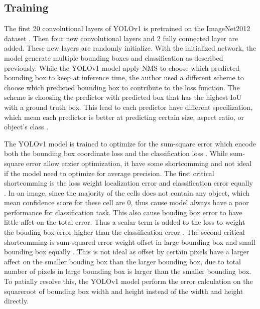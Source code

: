 \subsection{Training}
The first 20 convolutional layers of YOLOv1 is pretrained on the ImageNet2012 dataset \cite{ImageNet_dataset}. Then four new convolutional layers and 2 fully connected layer are added. These new layers are randomly initialize. With the initialized network, the model generate multiple bounding boxes and classification as described previously. While the YOLOv1 model apply NMS to choose which predicted bounding box to keep at inference time, the author used a different scheme to choose which predicted bounding box to contribute to the loss function. The scheme is choosing the predictor with predicted box that has the highest IoU with a ground truth box. This lead to each predictor have different specilization, which mean each predictor is better at predicting certain size, aspect ratio, or object's class \cite{yolov1_2016}.

The YOLOv1 model is trained to optimize for the sum-square error which encode both the bounding box coordinate loss and the classification loss \cite{yolov1_2016}. While sum-square error allow eazier optimization, it have some shortcomming and not ideal if the model need to optimize for average precision. The first critical shortcomming is the loss weight localization error and classification error equally \cite{yolov1_2016}. In an image, since the majority of the cells does not contain any object, which mean confidence score for these cell are 0, thus cause model always have a poor performance for classification task. This also cause bouding box error to have little affet on the total error. Thus a scalar term is added to the loss to weight the bouding box error higher than the classification error \cite{yolov1_2016}. The second critical shortcomming is sum-squared error weight offset in large bounding box and small bounding box equally \cite{yolov1_2016}. This is not ideal as offset by certain pixels have a larger affect on the smaller bouding box than the larger bounding box, due to total number of pixels in large bounding box is larger than the smaller bounding box. To patially resolve this, the YOLOv1 model perform the error calculation on the squareroot of bounding box width and height instead of the width and height directly.
